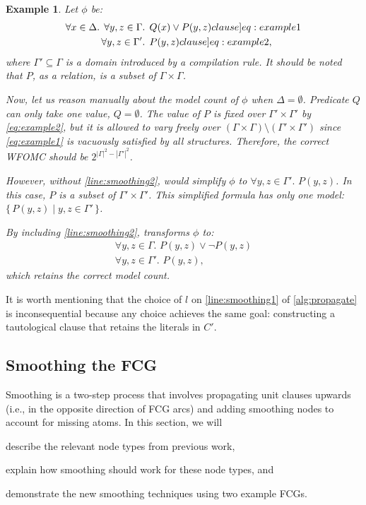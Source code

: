 \documentclass{article}
\newtheorem{example}{Example}
\theoremstyle{remark}
\begin{document}
\begin{example}\label{example:basecasesmoothing}
  Let $\phi$ be:
  \begin{align}
    \forall x \in \Delta\text{. }\forall y, z \in \Gamma&\text{. }Q(x) \lor P(y, z)\label[clause]{eq:example1}\\
    \forall y, z \in \Gamma'&\text{. }P(y, z)\label[clause]{eq:example2},
  \end{align}
  where $\Gamma' \subseteq \Gamma$ is a domain introduced by a compilation rule.
  It should be noted that $P$, as a relation, is a subset of
  $\Gamma \times \Gamma$.

  Now, let us reason manually about the model count of $\phi$ when
  $\Delta = \emptyset$. Predicate $Q$ can only take one value, $Q = \emptyset$.
  The value of $P$ is fixed over $\Gamma' \times \Gamma'$ by \cref{eq:example2},
  but it is allowed to vary freely over
  $(\Gamma \times \Gamma) \setminus (\Gamma' \times \Gamma')$ since
  \cref{eq:example1} is vacuously satisfied by all structures. Therefore, the
  correct WFOMC should be $2^{|\Gamma|^2 - |\Gamma'|^2}$.

  However, without \cref{line:smoothing2}, \Propagate would simplify $\phi$ to
  $\forall y, z \in \Gamma'\text{. }P(y, z)$. In this case, $P$ is a subset of
  $\Gamma' \times \Gamma'$. This simplified formula has only one model:
  $\{\, P(y, z) \mid y, z \in \Gamma' \,\}$.

  By including \cref{line:smoothing2}, \Propagate transforms $\phi$ to:
  \begin{gather*}
    \forall y, z \in \Gamma\text{. }P(y, z) \lor \neg P(y, z)\\
    \forall y, z \in \Gamma'\text{. }P(y, z),
  \end{gather*}
  which retains the correct model count.
\end{example}

It is worth mentioning that the choice of $l$ on \cref{line:smoothing1} of
\cref{alg:propagate} is inconsequential because any choice achieves the same
goal: constructing a tautological clause that retains the literals in $C'$.

\subsection{Smoothing the FCG}\label{sec:smoothingfcg1}

Smoothing is a two-step process that involves propagating unit clauses upwards
(i.e., in the opposite direction of FCG arcs) and adding smoothing nodes to
account for missing atoms. In this section, we will
\begin{enumerate*}[label=(\roman*)]
  \item describe the relevant node types from previous work,
  \item explain how smoothing should work for these node types, and
  \item demonstrate the new smoothing techniques using two example FCGs.
\end{enumerate*}
\end{document}
